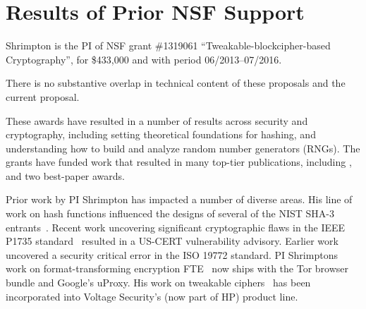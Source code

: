\section{Results of Prior NSF Support}
\label{sec:prior}


Shrimpton is the PI of NSF grant \#1319061 
``Tweakable-blockcipher-based Cryptography'', for \$433,000 and with
period 06/2013--07/2016. 

There is no substantive overlap in technical
content of these proposals and the current proposal.

 These awards have resulted in a number of results
across security and cryptography, including setting theoretical foundations for
hashing, and understanding how
to build and analyze random number generators (RNGs). The grants have funded work that
resulted in many top-tier publications, including
\cite{DRS09,BCS-journal09,OSS,BRSS10,fischlin2010random,RSS,PRS11,dyer2012peek,clrw,tct,Dyer-2013,luchaup2014libfte,luchaup2014formatted},
and two best-paper awards. 

  Prior work by PI Shrimpton has impacted a
number of diverse areas.  His line of work on hash functions influenced the designs of several of the NIST
SHA-3 entrants~\cite{DRS09,BCS-journal09,BRSS10,RSS}.  
%
Recent work uncovering significant cryptographic flaws in the IEEE
P1735 standard~\cite{CNS+17} resulted in a US-CERT vulnerability
advisory.  Earlier work~\cite{NRS} uncovered a security critical error
in the ISO 19772 standard.
%
PI Shrimptons work on format-transforming encryption FTE~\cite{Dyer-2013,luchaup2014libfte,luchaup2014formatted}
now ships with the Tor browser bundle and Google's uProxy. 
%
His work on tweakable ciphers~\cite{lrw,tct} has been incorporated into
Voltage Security's (now part of HP) product line.






